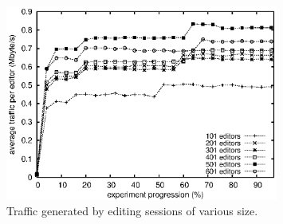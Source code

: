\begin{figure}
  \centering
  \includegraphics[width=0.8\textwidth]{img/traffic.eps}
  \caption{\label{fig:traffic} Traffic generated by editing sessions of
    various size.}
\end{figure}

